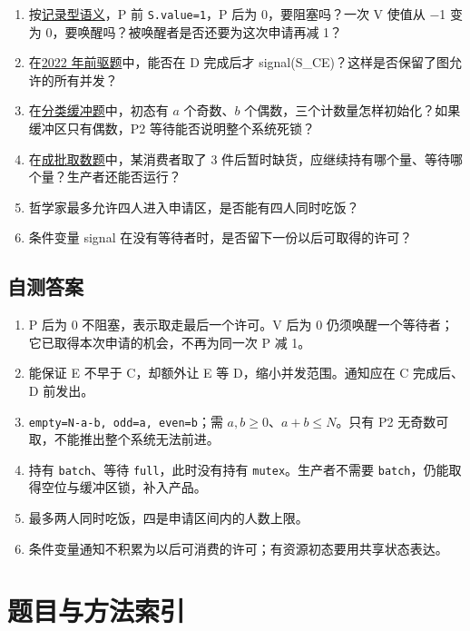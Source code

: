 \begin{enumerate}
\def\labelenumi{\arabic{enumi}.}
\tightlist
\item
  按\hyperref[sec-semaphore]{记录型语义}，P 前 \texttt{S.value=1}，P 后为 0，要阻塞吗？一次 V 使值从 −1 变为 0，要唤醒吗？被唤醒者是否还要为这次申请再减 1？
\item
  在\hyperref[ex-2022]{2022 年前驱题}中，能否在 D 完成后才 signal(S\_CE)？这样是否保留了图允许的所有并发？
\item
  在\hyperref[ex-2009]{分类缓冲题}中，初态有 \(a\) 个奇数、\(b\) 个偶数，三个计数量怎样初始化？如果缓冲区只有偶数，P2 等待能否说明整个系统死锁？
\item
  在\hyperref[ex-2014]{成批取数题}中，某消费者取了 3 件后暂时缺货，应继续持有哪个量、等待哪个量？生产者还能否运行？
\item
  哲学家最多允许四人进入申请区，是否能有四人同时吃饭？
\item
  条件变量 signal 在没有等待者时，是否留下一份以后可取得的许可？
\end{enumerate}

\subsection{自测答案}\label{ux81eaux6d4bux7b54ux6848}

\begin{enumerate}
\def\labelenumi{\arabic{enumi}.}
\tightlist
\item
  P 后为 0 不阻塞，表示取走最后一个许可。V 后为 0 仍须唤醒一个等待者；它已取得本次申请的机会，不再为同一次 P 减 1。
\item
  能保证 E 不早于 C，却额外让 E 等 D，缩小并发范围。通知应在 C 完成后、D 前发出。
\item
  \texttt{empty=N-a-b,\ odd=a,\ even=b}；需 \(a,b\ge0\)、\(a+b\le N\)。只有 P2 无奇数可取，不能推出整个系统无法前进。
\item
  持有 \texttt{batch}、等待 \texttt{full}，此时没有持有 \texttt{mutex}。生产者不需要 \texttt{batch}，仍能取得空位与缓冲区锁，补入产品。
\item
  最多两人同时吃饭，四是申请区间内的人数上限。
\item
  条件变量通知不积累为以后可消费的许可；有资源初态要用共享状态表达。
\end{enumerate}

\section{题目与方法索引}\label{sec-index}

